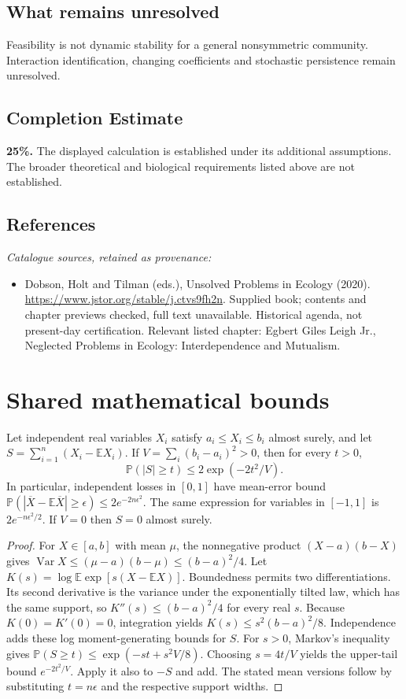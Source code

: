 \documentclass[11pt]{article}
\begin{document}
\subsection{What remains unresolved}
Feasibility is not dynamic stability for a general nonsymmetric community. Interaction identification, changing coefficients and stochastic persistence remain unresolved.
\subsection{Completion Estimate}
\textbf{25\%.} The displayed calculation is established under its additional assumptions. The broader theoretical and biological requirements listed above are not established.
\subsection{References}
\noindent\emph{Catalogue sources, retained as provenance:}
\begin{itemize}
\item Dobson, Holt and Tilman (eds.), Unsolved Problems in Ecology (2020). \url{https://www.jstor.org/stable/j.ctvs9fh2n}. Supplied book; contents and chapter previews checked, full text unavailable. Historical agenda, not present-day certification. Relevant listed chapter: Egbert Giles Leigh Jr., Neglected Problems in Ecology: Interdependence and Mutualism.
\end{itemize}




\section{Shared mathematical bounds}\label{app:bounds}
\begin{lemma}\label{lem:bounded}
Let independent real variables $X_i$ satisfy $a_i\leq X_i\leq b_i$ almost surely,
and let $S=\sum_{i=1}^n(X_i-\mathbb{E} X_i)$. If
$V=\sum_i(b_i-a_i)^2>0$, then for every $t>0$,
\[
 \mathbb{P}(|S|\geq t)\leq 2\exp(-2t^2/V).
\]
In particular, independent losses in $[0,1]$ have mean-error bound
$\mathbb{P}(|\overline X-\mathbb{E}\overline X|\geq\epsilon)
\leq2e^{-2n\epsilon^2}$. The same expression for variables in $[-1,1]$
is $2e^{-n\epsilon^2/2}$. If $V=0$ then $S=0$ almost surely.
\end{lemma}
\begin{proof}
For $X\in[a,b]$ with mean $\mu$, the nonnegative product
$(X-a)(b-X)$ gives
$\operatorname{Var} X\leq(\mu-a)(b-\mu)\leq(b-a)^2/4$.
Let $K(s)=\log\mathbb{E}\exp[s(X-\mathbb{E} X)]$.
Boundedness permits two differentiations. Its second derivative is the variance
under the exponentially tilted law, which has the same support, so
$K''(s)\leq(b-a)^2/4$ for every real $s$.
Because $K(0)=K'(0)=0$, integration yields
$K(s)\leq s^2(b-a)^2/8$.
Independence adds these log moment-generating bounds for $S$.
For $s>0$, Markov's inequality gives
$\mathbb{P}(S\geq t)\leq\exp(-st+s^2V/8)$.
Choosing $s=4t/V$ yields the upper-tail bound $e^{-2t^2/V}$.
Apply it also to $-S$ and add. The stated mean versions follow by substituting
$t=n\epsilon$ and the respective support widths.
\end{proof}
\end{document}
